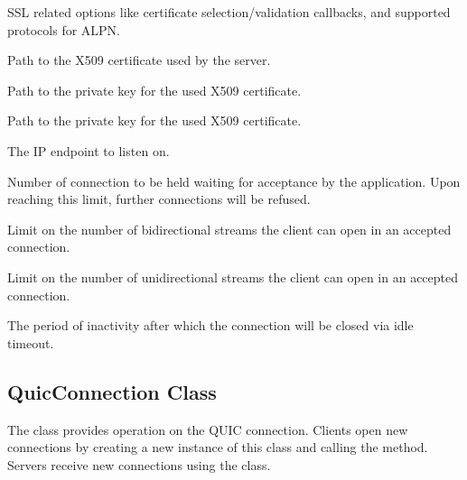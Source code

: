 \begin{description}

        SSL related options like certificate selection/validation callbacks, and supported protocols for ALPN\@.

     Path to the X509 certificate used by the server.

     Path to the private key for the used X509 certificate.

     Path to the private key for the used X509 certificate.

     The IP endpoint to listen on.

     Number of connection to be held waiting for acceptance by the application. Upon reaching this limit, further connections will be refused.

     Limit on the number of bidirectional streams the client can open in an accepted connection.

     Limit on the number of unidirectional streams the client can open in an accepted connection.

     The period of inactivity after which the connection will be closed via idle timeout.

\end{description}

\subsection{QuicConnection Class}

The  class provides operation on the QUIC connection. Clients open new
connections by creating a new instance of this class and calling the  method.
Servers receive new connections using the  class.


